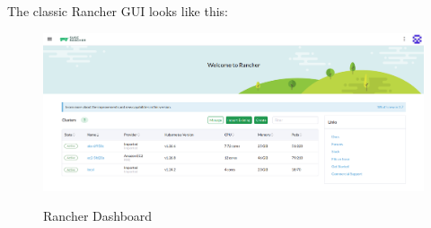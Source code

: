 The classic Rancher GUI looks like this:

\begin{figure}[H]
\centering
\caption {Rancher Dashboard}
\includegraphics[width=\linewidth]{images/rancher-dashboard.png}
\label{fig:rancherDashboard}
\end{figure}
